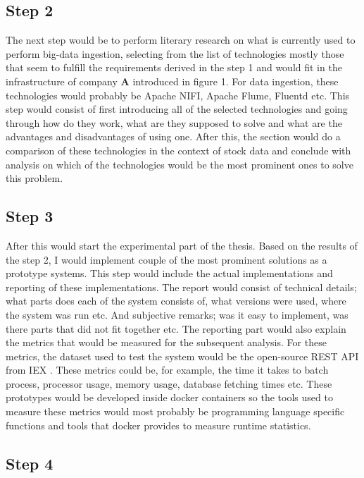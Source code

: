 \documentclass[article,11pt]{article}
\begin{document}
\subsection*{Step 2}

The next step would be to perform literary research on what is currently used to perform big-data ingestion, selecting from the list of technologies mostly those that seem to fulfill the requirements derived in the step 1 and would fit in the infrastructure of company \textbf{A} introduced in figure 1. For data ingestion, these technologies would probably be Apache NIFI, Apache Flume, Fluentd etc. This step would consist of first introducing all of the selected technologies and going through how do they work, what are they supposed to solve and what are the advantages and disadvantages of using one. After this, the section would do a comparison of these technologies in the context of stock data and conclude with analysis on which of the technologies would be the most prominent ones to solve this problem.

\subsection*{Step 3}

After this would start the experimental part of the thesis. Based on the results of the step 2, I would implement couple of the most prominent solutions as a prototype systems. This step would include the actual implementations and reporting of these implementations. The report would consist of technical details; what parts does each of the system consists of, what versions were used, where the system was run etc. And subjective remarks; was it easy to implement, was there parts that did not fit together etc. The reporting part would also explain the metrics that would be measured for the subsequent analysis. For these metrics, the dataset used to test the system would be the open-source REST API from IEX \cite{iex}. These metrics could be, for example, the time it takes to batch process, processor usage, memory usage, database fetching times etc. These prototypes would be developed inside docker containers so the tools used to measure these metrics would most probably be programming language specific functions and tools that docker provides to measure runtime statistics.

\subsection*{Step 4}
\end{document}
